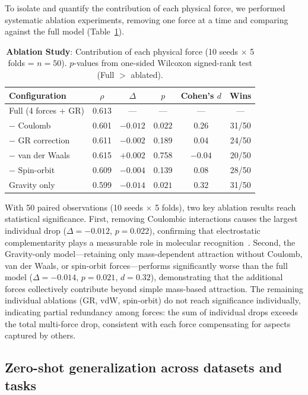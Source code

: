 \documentclass[11pt,a4paper]{article}
\begin{document}
To isolate and quantify the contribution of each physical force, we performed systematic ablation experiments, removing one force at a time and comparing against the full model (Table~\ref{tab:ablation}).

\begin{table}[h]
\centering
\caption{\textbf{Ablation Study}: Contribution of each physical force (10 seeds $\times$ 5 folds = $n = 50$). $p$-values from one-sided Wilcoxon signed-rank test (Full $>$ ablated).}
\label{tab:ablation}
\begin{tabular}{lccccc}
\toprule
\textbf{Configuration} & \textbf{$\rho$} & \textbf{$\Delta$} & \textbf{$p$} & \textbf{Cohen's $d$} & \textbf{Wins} \\
\midrule
Full (4 forces + GR) & $\mathbf{0.613}$ & --- & --- & --- & --- \\
$-$ Coulomb & 0.601 & $-0.012$ & $\mathbf{0.022}$ & 0.26 & 31/50 \\
$-$ GR correction & 0.611 & $-0.002$ & 0.189 & 0.04 & 24/50 \\
$-$ van der Waals & 0.615 & $+0.002$ & 0.758 & $-0.04$ & 20/50 \\
$-$ Spin-orbit & 0.609 & $-0.004$ & 0.139 & 0.08 & 28/50 \\
Gravity only & 0.599 & $-0.014$ & $\mathbf{0.021}$ & 0.32 & 31/50 \\
\bottomrule
\end{tabular}
\end{table}

With 50 paired observations (10 seeds $\times$ 5 folds), two key ablation results reach statistical significance. First, removing Coulombic interactions causes the largest individual drop ($\Delta = -0.012$, $p = 0.022$), confirming that electrostatic complementarity plays a measurable role in molecular recognition~\cite{block2015}. Second, the Gravity-only model---retaining only mass-dependent attraction without Coulomb, van der Waals, or spin-orbit forces---performs significantly worse than the full model ($\Delta = -0.014$, $p = 0.021$, $d = 0.32$), demonstrating that the additional forces collectively contribute beyond simple mass-based attraction. The remaining individual ablations (GR, vdW, spin-orbit) do not reach significance individually, indicating partial redundancy among forces: the sum of individual drops exceeds the total multi-force drop, consistent with each force compensating for aspects captured by others.

\subsection{Zero-shot generalization across datasets and tasks}
\end{document}
